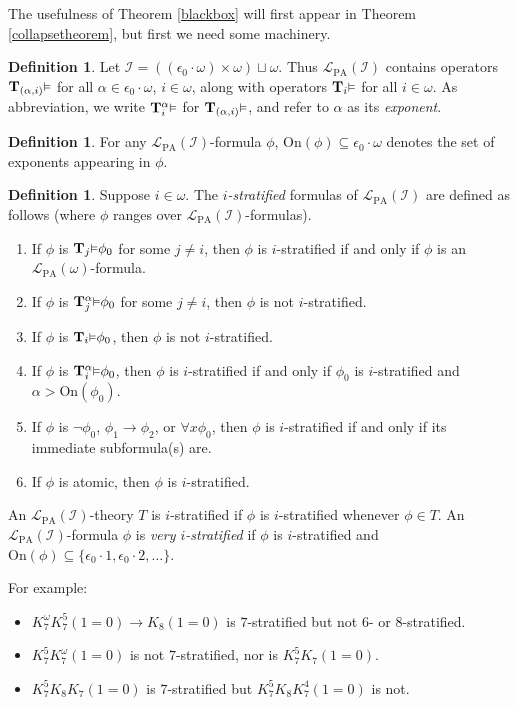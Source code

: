 \documentclass[reqno]{article}
\theoremstyle{definition}
\newtheorem{definition}[theorem]{Definition}
\def\L{\mathscr{L}}
\def\T{\mathbf{T}}
\def\LPA{\L_{\mathrm{PA}}}
\def\epom{\epsilon_0\cdot\omega}
\def\indset{\mathcal I}
\def\onset{\mathrm{On}}
\renewcommand{\Pr}[1]{\T_{#1}\mbox{\small${\vDash}$}}
\newcommand{\Prr}[2]{\T^{#1}_{#2}\mbox{\small${\vDash}$}}
\begin{document}
\vspace{-.2in}
The usefulness of Theorem \ref{blackbox} will first appear
in Theorem \ref{collapsetheorem}, but first we need some machinery.


\begin{definition}
Let $\indset=((\epom)\times\omega)\sqcup\omega$.
Thus $\LPA(\indset)$ contains operators $\Pr{(\alpha,i)}$ for all $\alpha\in\epom$, $i\in\omega$,
along with operators $\Pr{i}$ for all $i\in\omega$.
As abbreviation,
we write $\Prr{\alpha}{i}$ for $\Pr{(\alpha,i)}$,
and refer to $\alpha$ as its \emph{exponent}.
\end{definition}

\begin{definition}
For any $\LPA(\indset)$-formula $\phi$, $\onset(\phi)\subseteq\epom$ denotes the set of exponents appearing in $\phi$.
\end{definition}

\begin{definition}
Suppose $i\in\omega$.
The \emph{$i$-stratified} formulas of $\LPA(\indset)$ are defined as follows (where $\phi$ ranges over $\LPA(\indset)$-formulas).
\begin{enumerate}
\item If $\phi$ is $\Pr j\phi_0$ for some $j\not=i$, then $\phi$ is $i$-stratified if and only if $\phi$ is an $\LPA(\omega)$-formula.
\item If $\phi$ is $\Prr\alpha j\phi_0$ for some $j\not=i$, then $\phi$ is not $i$-stratified.
\item If $\phi$ is $\Pr i\phi_0$, then $\phi$ is not $i$-stratified.
\item If $\phi$ is $\Prr\alpha i\phi_0$, then $\phi$ is $i$-stratified if and only if $\phi_0$ is $i$-stratified and
$\alpha>\onset(\phi_0)$.
\item If $\phi$ is $\neg\phi_0$, $\phi_1\rightarrow\phi_2$, or $\forall x\phi_0$,
then $\phi$ is $i$-stratified if and only if its immediate subformula(s) are.
\item If $\phi$ is atomic, then $\phi$ is $i$-stratified.
\end{enumerate}
An $\LPA(\indset)$-theory $T$ is $i$-stratified if $\phi$ is $i$-stratified whenever $\phi\in T$.
An $\LPA(\indset)$-formula $\phi$ is \emph{very $i$-stratified} if $\phi$ is $i$-stratified
and $\onset(\phi)\subseteq\{\epsilon_0\cdot 1,\epsilon_0\cdot 2,\ldots\}$.
\end{definition}

For example:
\begin{itemize}
\item $K^{\omega}_7K^5_7(1=0)\rightarrow K_8(1=0)$ is $7$-stratified but not $6$- or $8$-stratified.
\item $K^5_7K^\omega_7(1=0)$ is not $7$-stratified, nor is $K^5_7K_7(1=0)$.
\item $K^5_7K_8K_7(1=0)$ is $7$-stratified but $K^5_7K_8K^4_7(1=0)$ is not.
\end{itemize}
\end{document}
